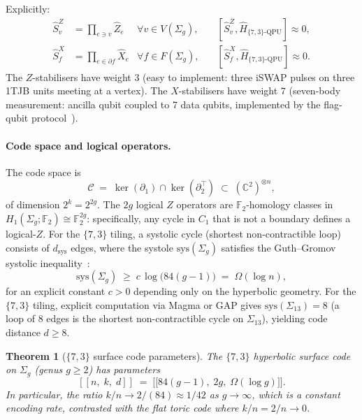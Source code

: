 \documentclass[11pt,oneside]{amsbook}
\numberwithin{equation}{section}
\theoremstyle{plain}
\newtheorem{theorem}{Theorem}[section]
\theoremstyle{definition}
\theoremstyle{remark}
\begin{document}
Explicitly:
\begin{align}
  \hat{S}_v^Z &= \prod_{e\ni v} \hat{Z}_e
  &\forall v\in V(\Sigma_g),\quad
  &[\hat{S}_v^Z,\hat{H}_{\{7,3\}\text{-QPU}}] \approx 0,
\label{eq:Z_stabilizer}\\
  \hat{S}_f^X &= \prod_{e\in\partial f} \hat{X}_e
  &\forall f\in F(\Sigma_g),\quad
  &[\hat{S}_f^X,\hat{H}_{\{7,3\}\text{-QPU}}] \approx 0.
\label{eq:X_stabilizer}
\end{align}
The $Z$-stabilisers have weight $3$ (easy to implement: three iSWAP pulses
on three 1TJB units meeting at a vertex).  The $X$-stabilisers have weight
$7$ (seven-body measurement: ancilla qubit coupled to 7 data qubits, implemented
by the flag-qubit protocol~\cite{ChamberlaineEtAl2018}).

\paragraph{Code space and logical operators.}
The code space is
\[
  \mathcal{C} \;=\; \ker(\partial_1)\cap\ker(\partial_2^\top)
  \;\subset\; (\mathbb{C}^2)^{\otimes n},
\]
of dimension $2^k = 2^{2g}$.  The $2g$ logical $Z$ operators are
$\mathbb{F}_2$-homology classes in $H_1(\Sigma_g;\mathbb{F}_2)\cong
\mathbb{F}_2^{2g}$: specifically, any cycle in $C_1$ that is not a boundary
defines a logical-$Z$.  For the $\{7,3\}$ tiling, a systolic cycle
(shortest non-contractible loop) consists of $d_{\text{sys}}$ edges,
where the systole $\mathrm{sys}(\Sigma_g)$ satisfies the
Guth--Gromov systolic inequality~\cite{GuthGromov2010}:
\begin{equation}
  \mathrm{sys}(\Sigma_g) \;\ge\; c\,\log\!\bigl(84(g-1)\bigr)
  \;=\; \Omega(\log n),
\label{eq:systole_bound}
\end{equation}
for an explicit constant $c > 0$ depending only on the hyperbolic geometry.
For the $\{7,3\}$ tiling, explicit computation via Magma or GAP
gives $\mathrm{sys}(\Sigma_{13}) = 8$ (a loop of 8 edges is the shortest
non-contractible cycle on $\Sigma_{13}$), yielding code distance $d \ge 8$.

\begin{theorem}[$\{7,3\}$ surface code parameters]
\label{thm:73_code}
The $\{7,3\}$ hyperbolic surface code on $\Sigma_g$ (genus $g \ge 2$) has
parameters
\[
  [[n,\; k,\; d]] \;=\;
  \bigl[\bigl[84(g-1),\; 2g,\; \Omega(\log g)\bigr]\bigr].
\]
In particular, the ratio $k/n \to 2/(84) \approx 1/42$ as $g\to\infty$,
which is a constant encoding rate, contrasted with the flat toric code
where $k/n = 2/n \to 0$.
\end{theorem}
\end{document}
